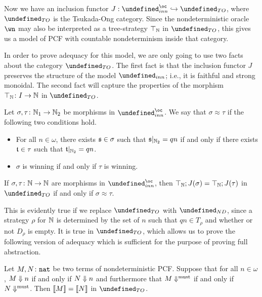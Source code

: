 \documentclass[sigplan,10pt,review]{acmart}\settopmatter{printfolios=true,printccs=false,printacmref=false}
\let\G\undefined
\begin{document}
Now we have an inclusion functor $J:\G_{inn}^\oc\hookrightarrow\G_{TO}$, where $\G_{TO}$ is the Tsukada-Ong category.  
Since the nondeterministic oracle $\wn$ may also be interpreted as a tree-strategy $\top_{\mathbb{N}}$ in $\G_{TO}$, this gives us a model of PCF with countable nondeterminism inside that category.  

In order to prove adequacy for this model, we are only going to use two facts about the category $\G_{TO}$.  
The first fact is that the inclusion functor $J$ preserves the structure of the model $\G_{inn}$; i.e., it is faithful and strong monoidal.  
The second fact will capture the properties of the morphism $\top_{\mathbb{N}}\colon I \to \mathbb{N}$ in $\G_{TO}$.  

\begin{definition}
  Let $\sigma,\tau\colon\mathbb{N}_1\to\mathbb{N}_2$ be morphisms in $\G_{inn}^\oc$.  
  We say that $\sigma\approx\tau$ if the following two conditions hold.
  \begin{itemize}
    \item For all $n\in\omega$, there exists $\mathfrak s\in\sigma$ such that $\mathfrak s\vert_{\mathbb{N}_2}=qn$ if and only if there exists $\mathfrak t\in\tau$ such that $\mathfrak t\vert_{\mathbb{N}_2}=qn$.  
    \item $\sigma$ is winning if and only if $\tau$ is winning.
  \end{itemize}
\end{definition}

\begin{proposition}
  If $\sigma,\tau\colon\mathbb{N}\to\mathbb{N}$ are morphisms in $\G_{inn}^\oc$, then $\top_{\mathbb{N}};J(\sigma)=\top_{\mathbb{N}};J(\tau)$ in $\G_{TO}$ if and only if $\sigma\approx\tau$.  
\end{proposition}

This is evidently true if we replace $\G_{TO}$ with $\G_{ND}$, since a strategy $\rho$ for $\mathbb{N}$ is determined by the set of $n$ such that $qn\in T_\rho$ and whether or not $D_\rho$ is empty.  
It is true in $\G_{TO}$, which allows us to prove the following version of adequacy which is sufficient for the purpose of proving full abstraction.

\begin{theorem}
  Let $M,N\colon{\mathtt{nat}}$ be two terms of nondeterministic PCF.  
  Suppose that for all $n\in\omega$, $M\Downarrow n$ if and only if $N\Downarrow n$ and furthermore that $M\Downarrow^{\text{must}}$ if and only if $N\Downarrow^{\text{must}}$.  
  Then $\left\llbracket M\right\rrbracket=\left\llbracket N\right\rrbracket$ in $\G_{TO}$.  
\end{theorem}
\end{document}
